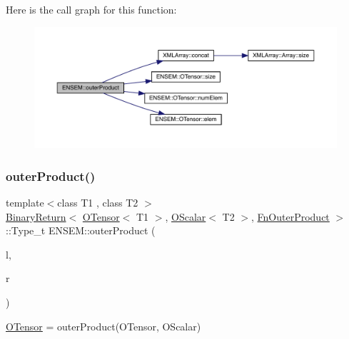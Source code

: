 Here is the call graph for this function\+:\nopagebreak
\begin{figure}[H]
\begin{center}
\leavevmode
\includegraphics[width=350pt]{de/d87/group__obstensor_ga89521e9a934b14066eac700fe2539b53_cgraph}
\end{center}
\end{figure}
\mbox{\label{group__obstensor_ga2f3f321adaac09837bf726a64c539c11}} 
\subsubsection{\texorpdfstring{outerProduct()}{outerProduct()}\hspace{0.1cm}{\footnotesize\ttfamily [2/3]}}
{\footnotesize\ttfamily template$<$class T1 , class T2 $>$ \\
\mbox{\hyperlink{structENSEM_1_1BinaryReturn}{Binary\+Return}}$<$ \mbox{\hyperlink{classENSEM_1_1OTensor}{O\+Tensor}}$<$ T1 $>$, \mbox{\hyperlink{classENSEM_1_1OScalar}{O\+Scalar}}$<$ T2 $>$, \mbox{\hyperlink{structENSEM_1_1FnOuterProduct}{Fn\+Outer\+Product}} $>$\+::Type\+\_\+t E\+N\+S\+E\+M\+::outer\+Product (\begin{DoxyParamCaption}\item[{const \mbox{\hyperlink{classENSEM_1_1OTensor}{O\+Tensor}}$<$ T1 $>$ \&}]{l,  }\item[{const \mbox{\hyperlink{classENSEM_1_1OScalar}{O\+Scalar}}$<$ T2 $>$ \&}]{r }\end{DoxyParamCaption})\hspace{0.3cm}{\ttfamily [inline]}}



\mbox{\hyperlink{classENSEM_1_1OTensor}{O\+Tensor}} = outer\+Product(\+O\+Tensor, O\+Scalar) 

